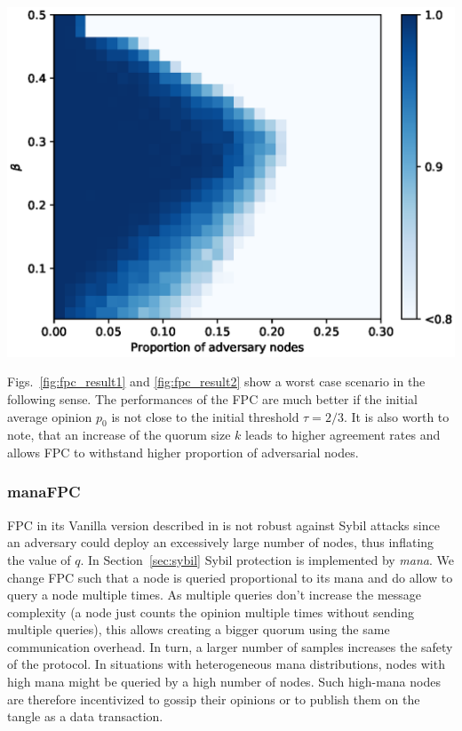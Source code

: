 \documentclass[../main.tex]{subfiles}
\begin{document}
\begin{center}
\begin{minipage}{\textwidth}
     \centering
     \includegraphics[scale=0.55]{images/2D__q_beta_agreement_2.eps}
     \label{fig:fpc_result2}
\end{minipage}\hfill
\end{center}

Figs.~\ref{fig:fpc_result1} and \ref{fig:fpc_result2} show a worst case scenario in the following sense. The performances of the FPC are much better if the initial average opinion $p_0$ is not close to the initial threshold $\tau=2/3.$ It is also worth to note, that an increase of the quorum size $k$ leads to higher agreement rates and allows FPC to withstand higher proportion of adversarial nodes. 

\subsubsection{manaFPC}
FPC in its Vanilla version described in \cite{popov2019} is not robust against Sybil attacks since an adversary could deploy an excessively large number of nodes, thus inflating the value of $q$.
In Section~\ref{sec:sybil} Sybil protection is implemented by \emph{mana}.
We change  FPC such that a node is queried proportional to its mana and do allow to query a node multiple times. As multiple queries don't increase the message complexity (a node just counts the opinion multiple times without sending multiple queries), this allows creating a bigger quorum using the same communication overhead. In turn, a larger number of samples increases the safety of the protocol.  
In situations with heterogeneous mana distributions, nodes with high mana might be queried by a high number of  nodes. Such high-mana nodes are therefore incentivized to gossip their opinions or to publish them on the tangle as a data transaction.
\end{document}
